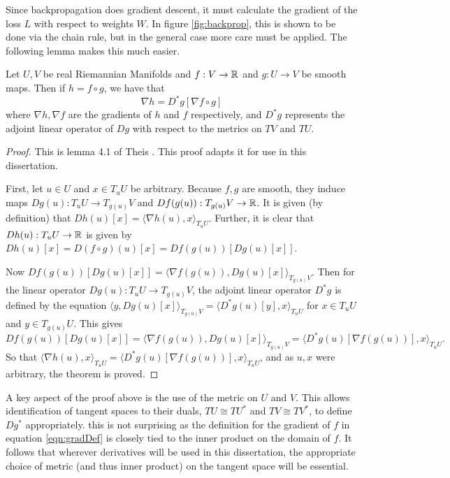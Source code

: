 Since backpropagation does gradient descent, it must calculate the gradient of the loss $L$ with respect to weights $W$. In figure \ref{fig:backprop}, this is shown to be done via the chain rule, but in the general case more care must be applied. The following lemma makes this much easier.
\begin{lemm}\label{gradChain}
	Let $U,V$ be real Riemannian Manifolds and $f:V\rightarrow \mathbb R$ and $g:U\rightarrow V$ be smooth maps.  Then if $h=f\circ g$, we have that 
	\[\nabla h=D^{\ast}g[\nabla f\circ g]\]
	where $\nabla h,\nabla f$ are the gradients of $h$ and $f$ respectively, and $D^{\ast}g$ represents the adjoint linear operator of $Dg$ with respect to the metrics on $TV$ and $TU$.
\end{lemm}
\begin{proof}
	This is lemma 4.1 of Theis \citep{matGradChain}. This proof adapts it for use in this dissertation. 
	
	First, let $u \in U$ and $x\in T_uU$ be arbitrary. Because $f,g$ are smooth, they induce maps $Dg(u):T_uU\rightarrow T_{g(u)}V$ and $Df(g(u)):T_{g(u)}V\rightarrow \mathbb R$.
	It is given (by definition) that $Dh(u)[x]=\langle \nabla h(u),x\rangle_{T_uU}$. Further, it is clear that $Dh(u):T_uU\rightarrow\mathbb R$ is given by $Dh(u)[x]=D(f\circ g)(u)[x]=Df(g(u))[Dg(u)[x]]$. 
	
	Now $Df(g(u))[Dg(u)[x]]=\langle\nabla f(g(u)),Dg(u)[x]\rangle_{T_{g(u)}V}$.  Then for the linear operator $Dg(u):T_uU\rightarrow T_{g(u)}V$, the adjoint linear operator $D^{\ast}g$ is defined by the equation $\langle y,Dg(u)[x]\rangle_{T_{g(u)}V}=\langle D^{\ast}g(u)[y],x\rangle_{T_uU}$ for $x\in T_uU$ and $y\in T_{g(u)}U$.  This gives  
	\[Df(g(u))[Dg(u)[x]]=\langle\nabla f(g(u)),Dg(u)[x]\rangle_{T_{g(u)}V}=\langle D^{\ast}g(u)[\nabla f(g(u))],x\rangle_{T_uU}.\]
	So that $\langle \nabla h(u),x\rangle_{T_uU}=\langle D^{\ast}g(u)[\nabla f(g(u))],x\rangle_{T_uU}$, and as $u,x$ were arbitrary, the theorem is proved.
\end{proof}

A key aspect of the proof above is the use of the metric on $U$ and $V$. This allows identification of tangent spaces to their duals, $TU\cong TU^{*}$ and  $TV\cong TV^{*}$, to define $Dg^{*}$ appropriately. this is not surprising as the definition for the gradient of \( f \) in equation \ref{eqn:gradDef} is closely tied to the inner product on the domain of \( f \).  It follows that wherever derivatives will be used in this dissertation, the appropriate choice of metric (and thus inner product) on the tangent space will be essential. 

